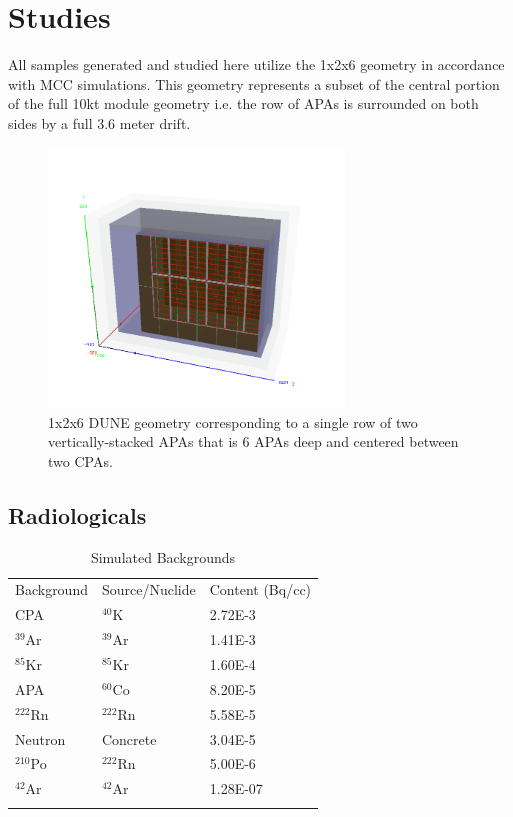 \documentclass[11pt]{article}
\newcommand{\rowtitlestyle}{
  \rowcolor{lightblue}
}
\newcommand{\colhline}{
  \arrayrulecolor{gray}
  \specialrule{0.5pt}{0pt}{1pt}
  \arrayrulecolor{black}
}
\newcommand{\toprowrule}{
  \arrayrulecolor{gray}
  \specialrule{1.2pt}{0pt}{1pt}
  \arrayrulecolor{black}
}
\begin{document}
\section{Studies}

All samples generated and studied here utilize the 1x2x6 geometry in accordance with MCC simulations. This geometry represents a subset of the central portion of the full 10kt module geometry i.e. the row of APAs is surrounded on both sides by a full 3.6 meter drift. 

\begin{figure}[H]
    \centering
    \includegraphics[width=0.7\textwidth]{dune_1x2x6_full_axes_test.png}
    \caption{1x2x6 DUNE geometry corresponding to a single row of two vertically-stacked APAs that is 6 APAs deep and centered between two CPAs.}
    \label{fig:geom}
\end{figure}

\subsection{Radiologicals}

\begin{table}[h!]
\begin{center}
\caption{Simulated Backgrounds}
\begin{tabular}{ |l|l|l| }
  \toprule
  \rowtitlestyle Background & Source/Nuclide & Content (Bq/cc) \\ 
  \toprowrule 
  CPA & $^{40}$K &2.72E-3 \\ \colhline
  $^{39}$Ar & $^{39}$Ar & 1.41E-3 \\ \colhline
  $^{85}$Kr &$^{85}$Kr &  1.60E-4 \\ \colhline
  APA & $^{60}$Co & 8.20E-5 \\ \colhline
  $^{222}$Rn & $^{222}$Rn & 5.58E-5 \\ \colhline
  Neutron & Concrete & 3.04E-5 \\ \colhline
  $^{210}$Po & $^{222}$Rn & 5.00E-6 \\ \colhline
  $^{42}$Ar & $^{42}$Ar & 1.28E-07 \\ \colhline
\end{tabular}
\label{tab:bkg}
\end{center}
\end{table}
\end{document}
